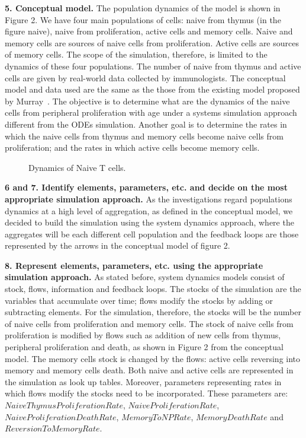 \documentclass{llncs}
\begin{document}
{\bf 5. Conceptual model.} The population dynamics of the model is shown in Figure 2. We have four main populations of cells: naive from thymus (in the figure naive), naive from proliferation, active cells and memory cells. Naive and memory cells are sources of naive cells from proliferation. Active cells are sources of memory cells. The scope of the simulation, therefore, is limited to the dynamics of these four populations. The number of naive from thymus and active cells are given by real-world data collected by immunologists. The conceptual model and data used are the same as the those from the existing model proposed by Murray~\cite{Murray:2003}. The objective is to determine what are the dynamics of the naive cells from peripheral proliferation with age under a systems simulation approach different from the ODEs simulation. Another goal is to determine the rates in which the naive cells from thymus and memory cells become naive cells from proliferation; and the rates in which active cells become memory cells.

\begin{figure}[!htpb]
\vspace{-20pt}
 \begin{center}
 \end{center}
 \label{fig:Conceptual}
 \vspace{-20pt}
 \caption{Dynamics of Naive T cells.}
 \vspace{-20pt}
\end{figure}

{\bf 6 and 7. Identify elements, parameters, etc. and decide on the most appropriate simulation approach.} As the investigations regard populations dynamics at a high level of aggregation, as defined in the conceptual model, we decided to build the simulation using the system dynamics approach, where the aggregates will be each different cell population and the feedback loops are those represented by the arrows in the conceptual model of figure 2.

{\bf 8. Represent elements, parameters, etc. using the appropriate simulation approach.} As stated before, system dynamics models consist of stock, flows, information and feedback loops. The stocks of the simulation are the variables that accumulate over time; flows modify the stocks by adding or subtracting elements. For the simulation, therefore, the stocks will be the number of naive cells from proliferation and memory cells. The stock of naive cells from proliferation is modified by flows such as addition of new cells from thymus, peripheral proliferation and death, as shown in Figure 2 from the conceptual model. The memory cells stock is changed by the flows: active cells reversing into memory and memory cells death. Both naive and active cells are represented in the simulation as look up tables. Moreover, parameters representing rates in which flows modify the stocks need to be incorporated. These parameters are: $NaiveThymusProliferationRate$, $NaiveProliferationRate$, $NaiveProliferationDeathRate$, $MemoryToNPRate$, $MemoryDeathRate$ and $ReversionToMemoryRate$.
\end{document}
